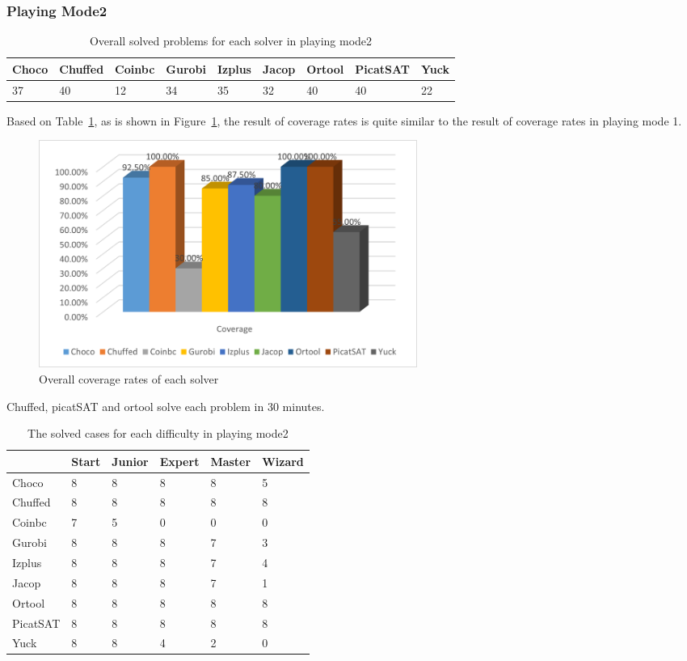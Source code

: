 \subsubsection{Playing Mode2}
\begin{table}[htbp]
\centering
\caption{Overall solved problems for each solver in playing mode2}
\label{tab:solvedcase2}
\begin{tabular}{|l|l|l|l|l|l|l|l|l|}
\hline
Choco & Chuffed & Coinbc& Gurobi & Izplus&Jacop& Ortool& PicatSAT&Yuck \\
\hline
37   &40      & 12    & 34    &35     &32   &40    &40      &22\\
\hline
\end{tabular}
\end{table}
Based on Table~\ref{tab:solvedcase2}, as is shown in Figure~\ref{fig:mode2eva2}, the result of coverage rates is quite similar to the result of coverage rates in playing mode 1.
\begin{figure}[H]
     \centering
    \includegraphics[width=0.6\textwidth]{figs/mode2coverage.png}
    \caption{Overall coverage rates of each solver}
    \label{fig:mode2eva2}
\end{figure}
Chuffed, picatSAT and ortool solve each problem in 30 minutes. 
\begin{table}[H]
\centering
\caption{The solved cases for each difficulty in playing mode2}
\label{tab:solvedcaseforeach difficulty2}
\begin{tabular}{|l|l|l|l|l|l|}
\hline
	    &Start	&Junior	&Expert	&Master	&Wizard\\
\hline
Choco	&8	&8	&8	&8	&5\\
\hline
Chuffed	&8	&8	&8	&8	&8\\
\hline
Coinbc	&7	&5	&0	&0	&0\\
\hline
Gurobi	&8	&8	&8	&7	&3\\
\hline
Izplus	&8	&8	&8	&7	&4\\
\hline
Jacop	&8	&8	&8	&7	&1\\
\hline
Ortool	&8	&8	&8	&8	&8\\
\hline
PicatSAT	&8	&8	&8	&8	&8\\
\hline
Yuck	&8	&8	&4	&2	&0\\
\hline
\end{tabular}
\end{table}
